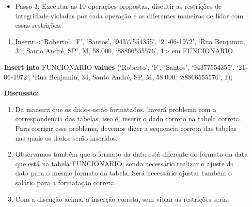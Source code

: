 \documentclass[
]{article}
\newenvironment{Shaded}{\begin{snugshade}}{\end{snugshade}}
\newcommand{\DecValTok}[1]{\textcolor[rgb]{0.00,0.00,0.81}{#1}}
\newcommand{\FloatTok}[1]{\textcolor[rgb]{0.00,0.00,0.81}{#1}}
\newcommand{\KeywordTok}[1]{\textcolor[rgb]{0.13,0.29,0.53}{\textbf{#1}}}
\newcommand{\NormalTok}[1]{#1}
\newcommand{\OperatorTok}[1]{\textcolor[rgb]{0.81,0.36,0.00}{\textbf{#1}}}
\newcommand{\StringTok}[1]{\textcolor[rgb]{0.31,0.60,0.02}{#1}}
\providecommand{\tightlist}{%
  \setlength{\itemsep}{0pt}\setlength{\parskip}{0pt}}
\begin{document}
\begin{itemize}
\tightlist
\item
  Passo 3: Executar as 10 operações propostas, discutir as restrições de
  integridade violadas por cada operação e as diferentes maneiras de
  lidar com essas restrições.
\end{itemize}

\begin{enumerate}
\def\labelenumi{\arabic{enumi}.}
\tightlist
\item
  Inserir \textless{}`Roberto', `F', `Santos', `94377554355',
  `21-06-1972', `Rua Benjamin, 34, Santo André, SP', M, 58.000,
  `88866555576', 1\textgreater{} em FUNCIONARIO.
\end{enumerate}

\begin{Shaded}
\begin{Highlighting}[]
\KeywordTok{Insert} \KeywordTok{into}\NormalTok{ FUNCIONARIO }\KeywordTok{values} 
\NormalTok{(‘Roberto’, ‘F’, ‘Santos’, ‘}\DecValTok{94377554355}\NormalTok{’, ‘}\DecValTok{21}\OperatorTok{{-}}\DecValTok{06}\OperatorTok{{-}}\DecValTok{1972}\NormalTok{’, ‘Rua Benjamin, }\DecValTok{34}\NormalTok{, Santo André, }
\StringTok{\textquotesingle{}SP\textquotesingle{}}\NormalTok{, M, }\FloatTok{58.000}\NormalTok{, ‘}\DecValTok{88866555576}\NormalTok{’, }\DecValTok{1}\NormalTok{);}
\end{Highlighting}
\end{Shaded}

\textbf{Discussão:}

\begin{enumerate}
\def\labelenumi{\roman{enumi}.}
\item
  Da maneira que os dados estão formatados, haverá problema com a
  correspondencia das tabelas, isso é, inserir o dado correto na tabela
  correta. Para corrigir esse problema, devemos dizer a sequencia
  correta das tabelas nas quais os dados serão inseridos.
\item
  Observamos também que o formato da data está diferente do formato da
  data que está na tabela FUNCIONARIO, sendo necessário realizar o
  ajuste da data para o mesmo formato da tabela. Será necessário ajustar
  também o salário para a formatação correta.
\item
  Com a discução acima, a inserção correta, sem violar as restrições
  seria:
\end{enumerate}
\end{document}
